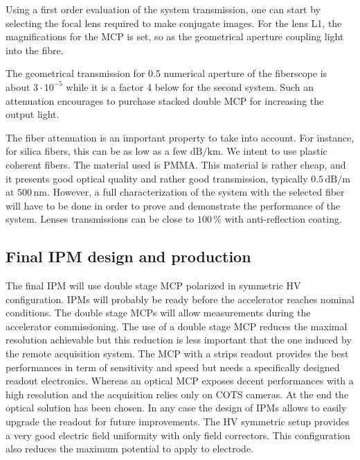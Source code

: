 

Using a first order evaluation of the system transmission, one can start by selecting the focal lens required to make conjugate images. For the lens L1, the magnifications for the MCP is set, so as the geometrical aperture coupling light into the fibre.

The geometrical transmission for 0.5 numerical aperture of the fiberscope is about $3 \cdot 10^{-5}$ while it is a factor 4 below for the second system. Such an attenuation encourages to purchase stacked double MCP for increasing the output light.

The fiber attenuation is an important property to take into account. For instance, for silica fibers, this can be as low as a few $\mathrm{dB/km}$. We intent to use plastic coherent fibers. The material used is PMMA. This material is rather cheap, and it presents good optical quality and rather good transmission, typically $0.5\,\mathrm{dB/m}$ at $500\,\mathrm{nm}$. However, a full characterization of the system with the selected fiber will have to be done in order to prove and demonstrate the performance of the system. Lenses transmissions can be close to $100\,\mathrm{\%}$ with anti-reflection coating.

\subsection*{Final IPM design and production}

The final IPM will use double stage MCP polarized in symmetric HV configuration.
IPMs will probably be ready before the accelerator reaches nominal conditions.
The double stage MCPs will allow measurements during the accelerator commissioning. The use of a double stage MCP reduces the maximal resolution achievable but this reduction is less important that the one induced by the remote acquisition system. The MCP with a strips readout provides the best performances in term of sensitivity and speed but needs a specifically designed readout electronics. Whereas an optical  MCP exposes decent performances with a high resolution and the acquisition relies only on COTS cameras. At the end the optical solution has been chosen. In any case the design of IPMs allows to easily upgrade the readout for future improvements.
The HV symmetric setup provides a very good electric field uniformity with only field correctors. This configuration also reduces the maximum potential to apply to electrode. 

